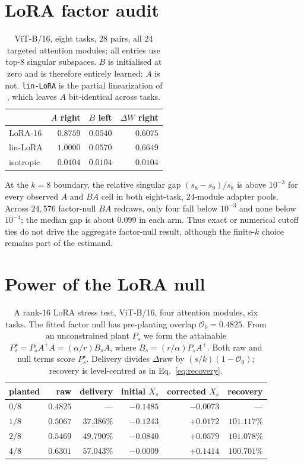 \section{LoRA factor audit}
\label{app:lora-factors}

\begin{table}[h]
\centering
\caption{ViT-B/16, eight tasks, $28$ pairs, all $24$ targeted attention modules; all entries use top-$8$ singular
subspaces. $B$ is initialised at zero and is therefore entirely learned; $A$ is not.
\texttt{lin-LoRA} is the partial linearization of \citet{tang2024linearization}, which leaves
$A$ bit-identical across tasks.}
\begin{tabular}{@{}lrrr@{}}
\toprule
& $A$ right & $B$ left & $\Delta W$ right \\
\midrule
LoRA-16   & $0.8759$ & $0.0540$ & $0.6075$ \\
lin-LoRA  & $1.0000$ & $0.0570$ & $0.6649$ \\
isotropic & $0.0104$ & $0.0104$ & $0.0104$ \\
\bottomrule
\end{tabular}
\end{table}

At the $k=8$ boundary, the relative singular gap
$(s_8-s_9)/s_8$ is above $10^{-3}$ for every observed $A$ and $BA$ cell in both
eight-task, $24$-module adapter pools.  Across $24{,}576$ factor-null $BA$ redraws, only four
fall below $10^{-3}$ and none below $10^{-4}$; the median gap is about $0.099$ in each arm.
Thus exact or numerical cutoff ties do not drive the aggregate factor-null result, although the
finite-$k$ choice remains part of the estimand.

\section{Power of the LoRA null}
\label{app:lora-power}

\begin{table}[h]
\centering
\caption{A rank-$16$ LoRA stress test, ViT-B/16, four attention modules, six tasks. The fitted
factor null has pre-planting overlap $\mathcal O_0=0.4825$. From an unconstrained plant $P_s$ we
form the attainable $P_s^\star=P_sA^+A=(\alpha/r)B_sA$, where
$B_s=(r/\alpha)P_sA^+$. Both raw and null terms score $P_s^\star$. Delivery divides
$\Delta\mathrm{raw}$ by $(s/k)(1-\mathcal O_0)$; recovery is level-centred as in
Eq.~\ref{eq:recovery}.}
\label{tab:lora-power}
\begin{tabular}{@{}lrrrrr@{}}
\toprule
planted & raw & delivery & initial $X_s$ & corrected $X_s$ & recovery \\
\midrule
$0/8$ & $0.4825$ & ---        & $-0.1485$ & $-0.0073$ & --- \\
$1/8$ & $0.5067$ & $37.386\%$ & $-0.1243$ & $+0.0172$ & $101.117\%$ \\
$2/8$ & $0.5469$ & $49.790\%$ & $-0.0840$ & $+0.0579$ & $101.078\%$ \\
$4/8$ & $0.6301$ & $57.043\%$ & $-0.0009$ & $+0.1414$ & $100.701\%$ \\
\bottomrule
\end{tabular}
\end{table}

